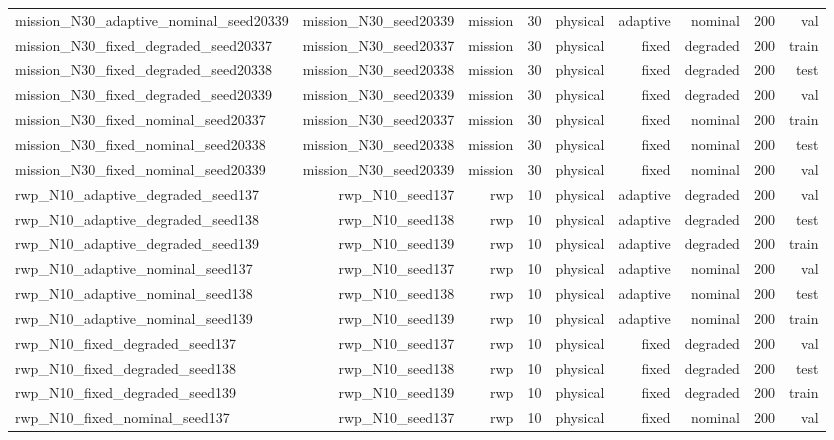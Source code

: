 \begin{tabular}{lrrrrrrrr}
mission\_N30\_adaptive\_nominal\_seed20339 & mission\_N30\_seed20339 & mission & 30 & physical & adaptive & nominal & 200 & val \\
mission\_N30\_fixed\_degraded\_seed20337 & mission\_N30\_seed20337 & mission & 30 & physical & fixed & degraded & 200 & train \\
mission\_N30\_fixed\_degraded\_seed20338 & mission\_N30\_seed20338 & mission & 30 & physical & fixed & degraded & 200 & test \\
mission\_N30\_fixed\_degraded\_seed20339 & mission\_N30\_seed20339 & mission & 30 & physical & fixed & degraded & 200 & val \\
mission\_N30\_fixed\_nominal\_seed20337 & mission\_N30\_seed20337 & mission & 30 & physical & fixed & nominal & 200 & train \\
mission\_N30\_fixed\_nominal\_seed20338 & mission\_N30\_seed20338 & mission & 30 & physical & fixed & nominal & 200 & test \\
mission\_N30\_fixed\_nominal\_seed20339 & mission\_N30\_seed20339 & mission & 30 & physical & fixed & nominal & 200 & val \\
rwp\_N10\_adaptive\_degraded\_seed137 & rwp\_N10\_seed137 & rwp & 10 & physical & adaptive & degraded & 200 & val \\
rwp\_N10\_adaptive\_degraded\_seed138 & rwp\_N10\_seed138 & rwp & 10 & physical & adaptive & degraded & 200 & test \\
rwp\_N10\_adaptive\_degraded\_seed139 & rwp\_N10\_seed139 & rwp & 10 & physical & adaptive & degraded & 200 & train \\
rwp\_N10\_adaptive\_nominal\_seed137 & rwp\_N10\_seed137 & rwp & 10 & physical & adaptive & nominal & 200 & val \\
rwp\_N10\_adaptive\_nominal\_seed138 & rwp\_N10\_seed138 & rwp & 10 & physical & adaptive & nominal & 200 & test \\
rwp\_N10\_adaptive\_nominal\_seed139 & rwp\_N10\_seed139 & rwp & 10 & physical & adaptive & nominal & 200 & train \\
rwp\_N10\_fixed\_degraded\_seed137 & rwp\_N10\_seed137 & rwp & 10 & physical & fixed & degraded & 200 & val \\
rwp\_N10\_fixed\_degraded\_seed138 & rwp\_N10\_seed138 & rwp & 10 & physical & fixed & degraded & 200 & test \\
rwp\_N10\_fixed\_degraded\_seed139 & rwp\_N10\_seed139 & rwp & 10 & physical & fixed & degraded & 200 & train \\
rwp\_N10\_fixed\_nominal\_seed137 & rwp\_N10\_seed137 & rwp & 10 & physical & fixed & nominal & 200 & val \\

\end{tabular}

